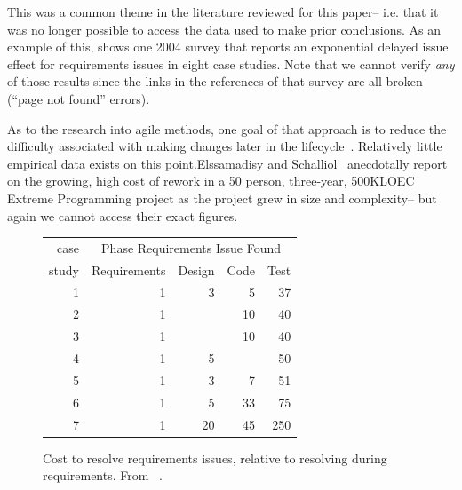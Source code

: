 This was a common theme in the literature reviewed for this paper-- i.e.  that  it was no longer possible to access
the data used to make prior conclusions.
As an example of this,  shows one 2004 survey that reports an 
exponential delayed issue  effect for 
requirements issues in eight case studies. Note that we cannot verify
{\em any} of those results since the links in the references of
that  survey are all broken (``page not found'' errors).


As to the research into agile methods, one goal of that approach
is to reduce the difficulty associated with making changes later in the lifecycle~\cite{beck00}. Relatively little empirical data exists on this point.Elssamadisy and Schalliol~\cite{Elssamadisy02} anecdotally report on the growing, high cost of rework in a 50 person, three-year, 500KLOEC Extreme Programming project as the project grew in size and complexity-- but again we cannot access their 
exact figures.


 


 \begin{figure}
{\small
\begin{center}
\begin{tabular}{r|rrrr}
 case& \multicolumn{4}{c}{Phase Requirements Issue Found }  \\
 study               &Requirements & Design & Code&  Test\\\hline
1& 1 &3& 5& 37\\  
2& 1  &    & 10 & 40 \\ 
3& 1   &    & 10 &  40 \\
4&  1  &   5 &      & 50  \\
5&  1 &3& 7& 51 \\
6& 1& 5 &33 &75  \\
7&  1 & 20 & 45 & 250 \\  
\end{tabular}
\end{center}}
\caption{Cost to resolve requirements issues, relative to resolving  during requirements. From ~\cite{steck04}.}\label{fig:steck}
\end{figure}


